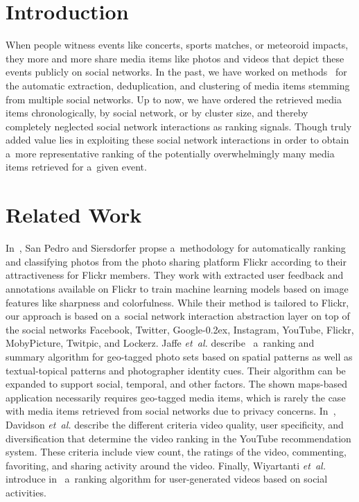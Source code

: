 \documentclass{sig-alternate}
\DeclareRobustCommand{\googleplus}{\mbox{Google\hspace{0em}\raisebox{.28ex}{\tiny\bf +}\kern-0.2ex}\xspace}
\begin{document}
\section{Introduction}

When people witness events like concerts, sports matches, or meteoroid impacts,
they more and more share media items like photos and videos
that depict these events publicly on social networks.
In the past, we have worked on methods~%
\cite{khrouf2012aggregatingsocialmedia,rizzo2012whatfresh,steiner2011addingmeaning}
for the automatic extraction, deduplication, and clustering of media items
stemming from multiple social networks.
Up to now, we have ordered the retrieved media items chronologically,
by social network, or by cluster size, and thereby completely neglected
social network interactions as ranking signals.
Though truly added value lies in exploiting these social network interactions
in order to obtain a~more representative ranking of the
potentially overwhelmingly many media items retrieved for a~given event.

\section{Related Work}

In~\cite{sanpedro2009ranking}, San Pedro and Siersdorfer propse a~methodology
for automatically ranking and classifying photos from the photo sharing platform Flickr
according to their attractiveness for Flickr members.
They work with extracted user feedback and annotations available on Flickr
to train machine learning models based on
image features like sharpness and colorfulness.
While their method is tailored to Flickr,
our approach is based on a~social network interaction abstraction layer
on top of the social networks Facebook, Twitter, \googleplus, Instagram,
YouTube, Flickr, MobyPicture, Twitpic, and Lockerz.
Jaffe \emph{et~al.} describe~\cite{jaffe2006generatingsummaries} 
a~ranking and summary algorithm for geo-tagged photo sets based on spatial patterns
as well as textual-topical patterns and photographer identity cues.
Their algorithm can be expanded to support social, temporal, and other factors.
The shown maps-based application necessarily requires geo-tagged media items,
which is rarely the case with media items retrieved from social networks
due to privacy concerns. 
In~\cite{davidson2010youtube}, Davidson \emph{et~al.} describe the different criteria
video quality, user specificity, and diversification
that determine the video ranking in the YouTube recommendation system.
These criteria include view count, the ratings of the video, commenting, favoriting,
and sharing activity around the video.
Finally, Wiyartanti \emph{et~al.} introduce in~\cite{wiyartanti2008ranking}
a~ranking algorithm for user-generated videos based on social activities.
\end{document}
